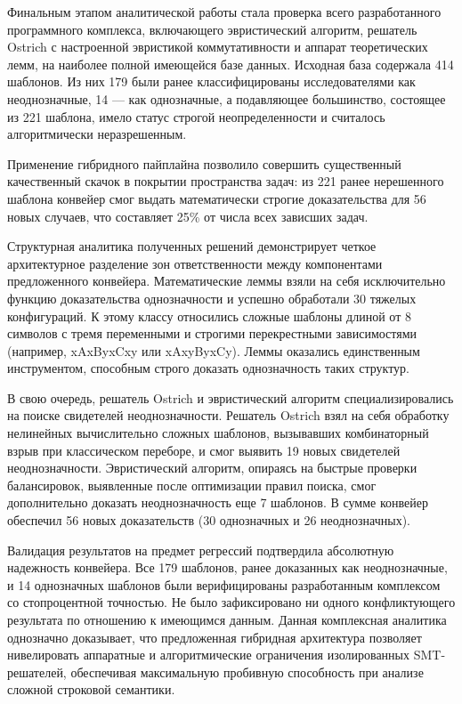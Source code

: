 \documentclass[14pt, russian]{scrartcl}
\begin{document}
Финальным этапом аналитической работы стала проверка всего разработанного программного комплекса, включающего эвристический алгоритм, решатель Ostrich с настроенной эвристикой коммутативности и аппарат теоретических лемм, на наиболее полной имеющейся базе данных. Исходная база содержала 414 шаблонов. Из них 179 были ранее классифицированы исследователями как неоднозначные, 14 --- как однозначные, а подавляющее большинство, состоящее из 221 шаблона, имело статус строгой неопределенности и считалось алгоритмически неразрешенным.

Применение гибридного пайплайна позволило совершить существенный качественный скачок в покрытии пространства задач: из 221 ранее нерешенного шаблона конвейер смог выдать математически строгие доказательства для 56 новых случаев, что составляет 25\% от числа всех зависших задач. 

Структурная аналитика полученных решений демонстрирует четкое архитектурное разделение зон ответственности между компонентами предложенного конвейера. Математические леммы взяли на себя исключительно функцию доказательства однозначности и успешно обработали 30 тяжелых конфигураций. К этому классу относились сложные шаблоны длиной от 8 символов с тремя переменными и строгими перекрестными зависимостями (например, xAxByxCxy или xAxyByxCy). Леммы оказались единственным инструментом, способным строго доказать однозначность таких структур. 

В свою очередь, решатель Ostrich и эвристический алгоритм специализировались на поиске свидетелей неоднозначности. Решатель Ostrich взял на себя обработку нелинейных вычислительно сложных шаблонов, вызывавших комбинаторный взрыв при классическом переборе, и смог выявить 19 новых свидетелей неоднозначности. Эвристический алгоритм, опираясь на быстрые проверки балансировок, выявленные после оптимизации правил поиска, смог дополнительно доказать неоднозначность еще 7 шаблонов. В сумме конвейер обеспечил 56 новых доказательств (30 однозначных и 26 неоднозначных).

Валидация результатов на предмет регрессий подтвердила абсолютную надежность конвейера. Все 179 шаблонов, ранее доказанных как неоднозначные, и 14 однозначных шаблонов были верифицированы разработанным комплексом со стопроцентной точностью. Не было зафиксировано ни одного конфликтующего результата по отношению к имеющимся данным. Данная комплексная аналитика однозначно доказывает, что предложенная гибридная архитектура позволяет нивелировать аппаратные и алгоритмические ограничения изолированных SMT-решателей, обеспечивая максимальную пробивную способность при анализе сложной строковой семантики.
\end{document}
